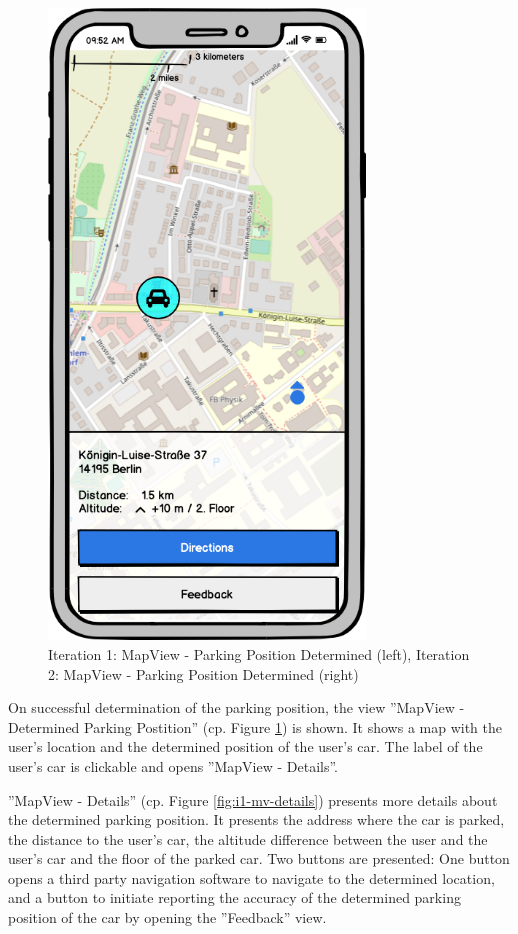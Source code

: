 \begin{figure}[h]
\begin{minipage}[b]{0.45\textwidth}
    \includegraphics[width=0.75\textwidth]{images/UI/Iteration2-MapView-ParkingPositionDetermined.png}
  \end{minipage}
  \caption{Iteration 1: MapView - Parking Position Determined (left), Iteration 2: MapView - Parking Position Determined (right)}
  \label{fig:i1-i2}
\end{figure}



On successful determination of the parking position, the view ''MapView - Determined Parking Postition'' (cp. Figure \ref{fig:i1-i2}) is shown. It shows a map with the user's location and the determined position of the user's car. The label of the user's car is clickable and opens ''MapView - Details''. 

''MapView - Details'' (cp. Figure \ref{fig:i1-mv-details}) presents more details about the determined parking position. It presents the address where the car is parked, the distance to the user's car, the altitude difference between the user and the user's car and the floor of the parked car. Two buttons are presented: One button opens a third party navigation software to navigate to the determined location, and a button to initiate reporting the accuracy of the determined parking position of the car by opening the ''Feedback'' view.


